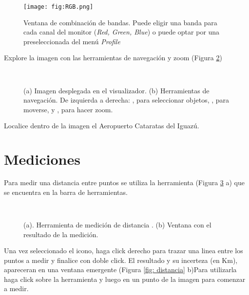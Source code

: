 \begin{figure}[h!]
    \centering
    \texttt{[image: fig:RGB.png]}
    \caption{Ventana de combinación de bandas. Puede eligir una banda para cada canal del monitor (\emph{Red, Green, Blue}) o puede optar por una preseleccionada del menú \emph{Profile}}
    \label{fig:RGB}
\end{figure}

Explore la imagen con las herramientas de navegación y zoom (Figura \ref{fig:mono})

\begin{figure}[h!]
    \centering
    \\
    \caption{(a) Imagen desplegada en el visualizador. (b) Herramientas de navegación. De izquierda a derecha: , para seleccionar objetos, , para moverse, y , para hacer zoom.}
    \label{fig:mono}
\end{figure}

Localice dentro de la imagen el Aeropuerto Cataratas del Iguazú.

\section{Mediciones}

Para medir una distancia entre puntos se utiliza la herramienta  (Figura \ref{fig:distancia} a) que se encuentra en la barra de herramientas.

\begin{figure}[h!]
    \centering
    \\
    \caption{(a). Herramienta de medición de distancia . (b) Ventana con el resultado de la medición.}
    \label{fig:distancia}
\end{figure}

Una vez seleccionado el icono, haga click derecho para trazar una linea entre los puntos a medir y finalice con doble click. El resultado y su incerteza (en Km), apareceran en una ventana emergente (Figura \ref{fig: distancia} b)Para utilizarla haga click sobre la herramienta y luego en un punto de la imagen para comenzar a medir.

